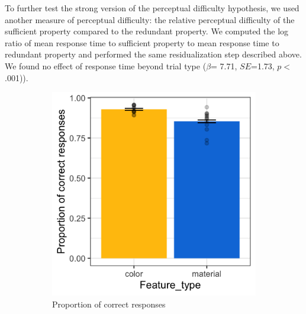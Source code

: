 \documentclass[12pt,letterpaper]{article}
\begin{document}
To further test the strong version of the perceptual difficulty hypothesis, we used another measure of perceptual difficulty: the relative perceptual difficulty of the sufficient property compared to the redundant property. We computed the log ratio of mean response time to sufficient property to mean response time to redundant property and performed the same residualization step described above. We found no effect of response time beyond trial type ($\beta$= 7.71, $SE$=1.73, $p$$<$.001)).

\begin{figure}[ht]
   \centering
   \begin{subfigure}{.4\textwidth}
   \centering
   \includegraphics[width=\textwidth]{plots/exp3_proportion.png}
   \caption{Proportion of correct responses}
   \label{fig:exp3_a}
   \end{subfigure} \hspace{9mm}
   \begin{subfigure}{.4 \textwidth}
   \centering

\end{subfigure}
\end{figure}
\end{document}
